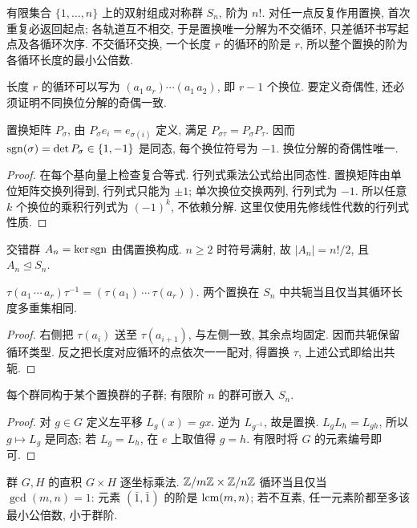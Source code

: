 有限集合 $\{1,\ldots,n\}$ 上的双射组成对称群 $S_n$, 阶为 $n!$. 对任一点反复作用置换, 首次重复必返回起点; 各轨道互不相交, 于是置换唯一分解为不交循环, 只差循环书写起点及各循环次序. 不交循环交换, 一个长度 $r$ 的循环的阶是 $r$, 所以整个置换的阶为各循环长度的最小公倍数.

长度 $r$ 的循环可以写为 $(a_1\,a_r)\cdots(a_1\,a_2)$, 即 $r-1$ 个换位. 要定义奇偶性, 还必须证明不同换位分解的奇偶一致.
\begin{proposition}
置换矩阵 $P_\sigma$, 由 $P_\sigma e_i=e_{\sigma(i)}$ 定义, 满足 $P_{\sigma\tau}=P_\sigma P_\tau$. 因而 $\operatorname{sgn}(\sigma)=\det P_\sigma\in\{1,-1\}$ 是同态, 每个换位符号为 $-1$. 换位分解的奇偶性唯一.
\end{proposition}
\begin{proof}
在每个基向量上检查复合等式. 行列式乘法公式给出同态性. 置换矩阵由单位矩阵交换列得到, 行列式只能为 $\pm1$; 单次换位交换两列, 行列式为 $-1$. 所以任意 $k$ 个换位的乘积行列式为 $(-1)^k$, 不依赖分解. 这里仅使用先修线性代数的行列式性质.
\end{proof}
\begin{definition}
交错群 $A_n=\ker\operatorname{sgn}$ 由偶置换构成. $n\ge2$ 时符号满射, 故 $|A_n|=n!/2$, 且 $A_n\trianglelefteq S_n$.
\end{definition}
\begin{proposition}
$\tau(a_1\,\cdots\,a_r)\tau^{-1}=(\tau(a_1)\,\cdots\,\tau(a_r))$. 两个置换在 $S_n$ 中共轭当且仅当其循环长度多重集相同.
\end{proposition}
\begin{proof}
右侧把 $\tau(a_i)$ 送至 $\tau(a_{i+1})$, 与左侧一致, 其余点均固定. 因而共轭保留循环类型. 反之把长度对应循环的点依次一一配对, 得置换 $\tau$, 上述公式即给出共轭.
\end{proof}
\begin{theorem}[凯莱]
每个群同构于某个置换群的子群; 有限阶 $n$ 的群可嵌入 $S_n$.
\end{theorem}
\begin{proof}
对 $g\in G$ 定义左平移 $L_g(x)=gx$. 逆为 $L_{g^{-1}}$, 故是置换. $L_gL_h=L_{gh}$, 所以 $g\mapsto L_g$ 是同态; 若 $L_g=L_h$, 在 $e$ 上取值得 $g=h$. 有限时将 $G$ 的元素编号即可.
\end{proof}
群 $G,H$ 的直积 $G\times H$ 逐坐标乘法. $\mathbb Z/m\mathbb Z\times\mathbb Z/n\mathbb Z$ 循环当且仅当 $\gcd(m,n)=1$: 元素 $(\bar1,\bar1)$ 的阶是 $\operatorname{lcm}(m,n)$; 若不互素, 任一元素阶都至多该最小公倍数, 小于群阶.


